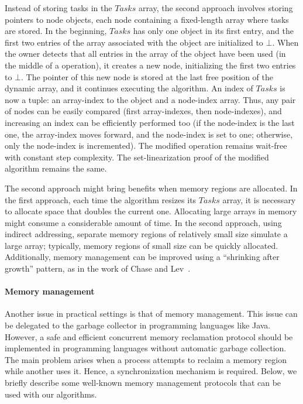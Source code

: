 Instead of storing tasks in the \(Tasks\) array, the second approach involves storing pointers to node objects, each node containing a fixed-length array where tasks are stored. In the beginning, \(Tasks\) has only one object in its first entry, and the first two entries of the array associated with the object are initialized to \(\bot\).  When the owner detects that all entries in the array of the object have been used (in the middle of a \Put{} operation), it creates a new node, initializing the first two entries to \(\bot\). The pointer of this new node is stored at the last free position of the dynamic array, and it continues executing the algorithm. An index of \(Tasks\) is now a tuple: an array-index to the object and a node-index array. Thus, any pair of nodes can be easily compared (first array-indexes, then node-indexes), and increasing an index can be efficiently performed too (if the node-index is the last one, the array-index moves forward, and the node-index is set to one; otherwise, only the node-index is incremented).  The modified \Put{} operation remains wait-free with constant step complexity. The set-linearization proof of the modified algorithm remains the same.


The second approach might bring benefits when memory regions are allocated. In the first approach, each time the algorithm resizes its \(Tasks\) array, it is necessary to allocate space that doubles the current one. {Allocating large arrays in memory might consume a considerable amount of time.} In the second approach, using indirect addressing, separate memory regions of relatively small size simulate a large array; typically, memory regions of small size can be quickly allocated. Additionally, memory management can be improved using a ``shrinking after growth'' pattern, as in the work of Chase and Lev~\cite{circular.work.stealing}.


\paragraph*{Memory management}

Another issue in practical settings is that of memory management. This issue can be delegated to the garbage collector in programming languages like Java. However, a safe and efficient concurrent memory reclamation protocol should be implemented in programming languages without automatic garbage collection. The main problem arises when a process attempts to reclaim a memory region while another uses it. Hence, a synchronization mechanism is required. Below, we briefly describe some well-known memory management protocols that can be used with our algorithms.

